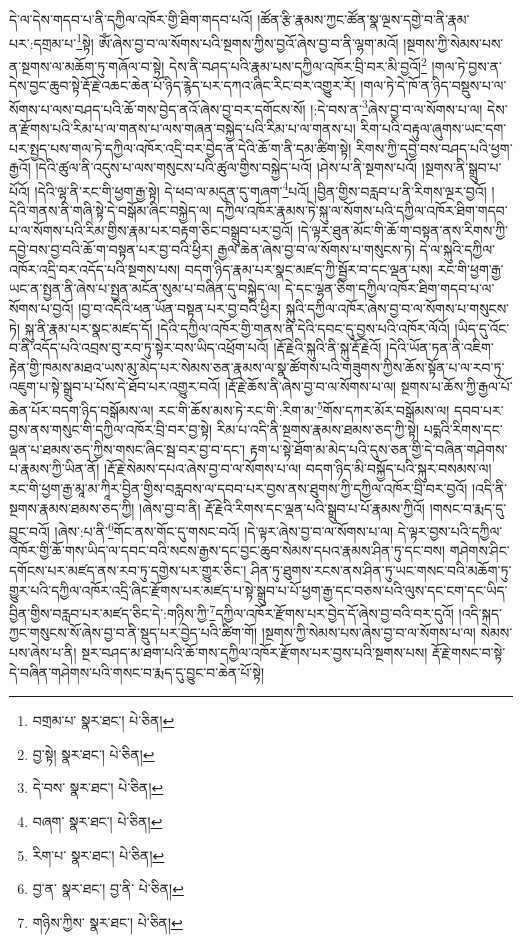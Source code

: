 དེ་ལ་དེས་གདབ་པ་ནི་དཀྱིལ་འཁོར་གྱི་ཐིག་གདབ་པའོ། །ཚོན་རྩི་རྣམས་ཀྱང་ཚོན་སྣ་ལྔས་དགྱེ་བ་ནི་རྣམ་པར་:དགྲམ་པ་\footnote{བགྲམ་པ་  སྣར་ཐང་།  པེ་ཅིན། }སྟེ། ཨོཾ་ཞེས་བྱ་བ་ལ་སོགས་པའི་སྔགས་ཀྱིས་བྱའོ་ཞེས་བྱ་བ་ནི་ལྷག་མའོ། །སྔགས་ཀྱི་སེམས་པས་ན་སྔགས་ལ་མཆོག་ཏུ་གཞོལ་བ་སྟེ། དེས་ནི་བཤད་པའི་རྣམ་པས་དཀྱིལ་འཁོར་བྲི་བར་མི་བྱའོ།\footnote{བྱ་སྟེ།  སྣར་ཐང་།  པེ་ཅིན། } །གལ་ཏེ་བྱས་ན་དེས་བྱང་ཆུབ་སྟེ་རྡོ་རྗེ་འཆང་ཆེན་པོ་ཉིད་རྙེད་པར་དཀའ་ཞིང་རིང་བར་འགྱུར་རོ། །གལ་ཏེ་དེ་ཁོ་ན་ཉིད་བསྡུས་པ་ལ་སོགས་པ་ལས་བཤད་པའི་ཆོ་གས་བྱེད་ནའོ་ཞེས་བྱ་བར་དགོངས་སོ། །:དེ་བས་ན་\footnote{དེ་བས་  སྣར་ཐང་།  པེ་ཅིན། }ཞེས་བྱ་བ་ལ་སོགས་པ་ལ། དེས་ན་རྫོགས་པའི་རིམ་པ་ལ་གནས་པ་ལས་གཞན་བསྐྱེད་པའི་རིམ་པ་ལ་གནས་པ། རིག་པའི་བརྟུལ་ཞུགས་ཡང་དག་པར་སྤྱད་པས་གལ་ཏེ་དཀྱིལ་འཁོར་འདྲི་བར་བྱེད་ན་དེའི་ཆོ་ག་ནི་དམ་ཚིག་སྟེ། རིགས་ཀྱི་དབྱེ་བས་བཤད་པའི་ཕྱག་རྒྱའོ། །དེའི་ཚུལ་ནི་འདུས་པ་ལས་གསུངས་པའི་ཚུལ་གྱིས་བསྐྱེད་པའོ། །ཤེས་པ་ནི་སྔགས་པའོ། །སྔགས་ནི་སྒྲུབ་པ་པོའོ། །དེའི་ལྷ་ནི་རང་གི་ཕྱག་རྒྱ་སྟེ། དེ་ཕབ་ལ་མདུན་དུ་གཞག་\footnote{བཞག་  སྣར་ཐང་།  པེ་ཅིན། }པའོ། །བྱིན་གྱིས་བརླབ་པ་ནི་རིགས་ལྔར་བྱའོ། །དེའི་གནས་ནི་གཞི་སྟེ་དེ་བསྒོམ་ཞིང་བསྐྱེད་ལ། དཀྱིལ་འཁོར་རྣམས་ཏེ་སྐུ་ལ་སོགས་པའི་དཀྱིལ་འཁོར་ཐིག་གདབ་པ་ལ་སོགས་པའི་རིམ་གྱིས་རྣམ་པར་བརྟག་ཅིང་བསྒྲུབ་པར་བྱའོ། །དེ་ལྟར་ཐུན་མོང་གི་ཆོ་ག་བསྟན་ནས་རིགས་ཀྱི་དབྱེ་བས་བྱ་བའི་ཆོ་ག་བསྟན་པར་བྱ་བའི་ཕྱིར། རྒྱལ་ཆེན་ཞེས་བྱ་བ་ལ་སོགས་པ་གསུངས་ཏེ། དེ་ལ་སྐུའི་དཀྱིལ་འཁོར་འདྲི་བར་འདོད་པའི་སྔགས་པས། བདག་ཉིད་རྣམ་པར་སྣང་མཛད་ཀྱི་སྦྱོར་བ་དང་ལྡན་པས། རང་གི་ཕྱག་རྒྱ་ཡང་ན་སྤྱན་ནི་ཞེས་པ་སྤྱན་མངོན་སུམ་པ་བཞིན་དུ་བསྐྱེད་ལ། དེ་དང་ལྷན་ཅིག་དཀྱིལ་འཁོར་ཐིག་གདབ་པ་ལ་སོགས་པ་བྱའོ། །བྱ་བ་འདིའི་ཕན་ཡོན་བསྟན་པར་བྱ་བའི་ཕྱིར། སྐུའི་དཀྱིལ་འཁོར་ཞེས་བྱ་བ་ལ་སོགས་པ་གསུངས་ཏེ། སྐུ་ནི་རྣམ་པར་སྣང་མཛད་དོ། །དེའི་དཀྱིལ་འཁོར་གྱི་གནས་ནི་དེའི་དབང་དུ་བྱས་པའི་འཁོར་ལོའོ། །ཡིད་དུ་འོང་བ་ནི་འདོད་པའི་འབྲས་བུ་རབ་ཏུ་སྟེར་བས་ཡིད་འཕྲོག་པའོ། །རྡོ་རྗེའི་སྐུའི་ནི་སྐུ་རྡོ་རྗེའོ། །དེའི་ཡོན་ཏན་ནི་འཇིག་རྟེན་གྱི་ཁམས་མཐའ་ཡས་མུ་མེད་པར་སེམས་ཅན་རྣམས་ལ་སྣ་ཚོགས་པའི་གཟུགས་ཀྱིས་ཆོས་སྟོན་པ་ལ་རབ་ཏུ་འཇུག་པ་སྟེ་སྒྲུབ་པ་པོས་དེ་ཐོབ་པར་འགྱུར་བའོ། །རྡོ་རྗེ་ཆོས་ནི་ཞེས་བྱ་བ་ལ་སོགས་པ་ལ། སྔགས་པ་ཆོས་ཀྱི་རྒྱལ་པོ་ཆེན་པོར་བདག་ཉིད་བསྒོམས་ལ། རང་གི་ཆོས་མས་ཏེ་རང་གི་:རིག་མ་\footnote{རིག་པ་  སྣར་ཐང་།  པེ་ཅིན། }གོས་དཀར་མོར་བསྒོམས་ལ། དབབ་པར་བྱས་ནས་གསུང་གི་དཀྱིལ་འཁོར་བྲི་བར་བྱ་སྟེ། རིམ་པ་འདི་ནི་སྔགས་རྣམས་ཐམས་ཅད་ཀྱི་སྟེ། པདྨའི་རིགས་དང་ལྡན་པ་ཐམས་ཅད་ཀྱིས་གསང་ཞིང་སྦ་བར་བྱ་བ་དང་། རྟག་པ་སྟེ་ཐོག་མ་མེད་པའི་དུས་ཅན་གྱི་དེ་བཞིན་གཤེགས་པ་རྣམས་ཀྱི་ཡིན་ནོ། །རྡོ་རྗེ་སེམས་དཔའ་ཞེས་བྱ་བ་ལ་སོགས་པ་ལ། བདག་ཉིད་མི་བསྐྱོད་པའི་སྐུར་བསམས་ལ། རང་གི་ཕྱག་རྒྱ་མཱ་མ་ཀཱིར་བྱིན་གྱིས་བརླབས་ལ་དབབ་པར་བྱས་ནས་ཐུགས་ཀྱི་དཀྱིལ་འཁོར་བྲི་བར་བྱའོ། །འདི་ནི་སྔགས་རྣམས་ཐམས་ཅད་ཀྱི། །ཞེས་བྱ་བ་ནི། རྡོ་རྗེའི་རིགས་དང་ལྡན་པའི་སྒྲུབ་པ་པོ་རྣམས་ཀྱིའོ། །གསང་བ་རྨད་དུ་བྱུང་བའོ། །ཞེས་:པ་ནི་\footnote{བྱ་ན་  སྣར་ཐང་། བྱ་ནི་  པེ་ཅིན། }གོང་ནས་གོང་དུ་གསང་བའོ། །དེ་ལྟར་ཞེས་བྱ་བ་ལ་སོགས་པ་ལ། དེ་ལྟར་བྱས་པའི་དཀྱིལ་འཁོར་གྱི་ཆོ་གས་ཡིད་ལ་དབང་བའི་སངས་རྒྱས་དང་བྱང་ཆུབ་སེམས་དཔའ་རྣམས་ཤིན་ཏུ་དང་བས། གཤེགས་ཤིང་དགོངས་པར་མཛད་ནས་རབ་ཏུ་དགྱེས་པར་གྱུར་ཅིང་། ཤིན་ཏུ་ཐུགས་རངས་ནས་ཤིན་ཏུ་ཡང་གསང་བའི་མཆོག་ཏུ་གྱུར་པའི་དཀྱིལ་འཁོར་འདྲི་ཞིང་རྫོགས་པར་མཛད་པ་སྟེ་སྒྲུབ་པ་པོ་ཕྱག་རྒྱ་དང་བཅས་པའི་ལུས་དང་ངག་དང་ཡིད་བྱིན་གྱིས་བརླབ་པར་མཛད་ཅིང་དེ་:གཉིས་ཀྱི་\footnote{གཉིས་ཀྱིས་  སྣར་ཐང་།  པེ་ཅིན། }དཀྱིལ་འཁོར་རྫོགས་པར་བྱེད་དོ་ཞེས་བྱ་བའི་བར་དུའོ། །འདི་སྐད་ཀྱང་གསུངས་སོ་ཞེས་བྱ་བ་ནི་སྡུད་པར་བྱེད་པའི་ཚིག་གོ། །སྔགས་ཀྱི་སེམས་པས་ཞེས་བྱ་བ་ལ་སོགས་པ་ལ། སེམས་པས་ཞེས་པ་ནི། སྔར་བཤད་མ་ཐག་པའི་ཆོ་གས་དཀྱིལ་འཁོར་རྫོགས་པར་བྱས་པའི་སྔགས་པས། རྡོ་རྗེ་གསང་བ་སྟེ་དེ་བཞིན་གཤེགས་པའི་གསང་བ་རྨད་དུ་བྱུང་བ་ཆེན་པོ་སྟེ། 